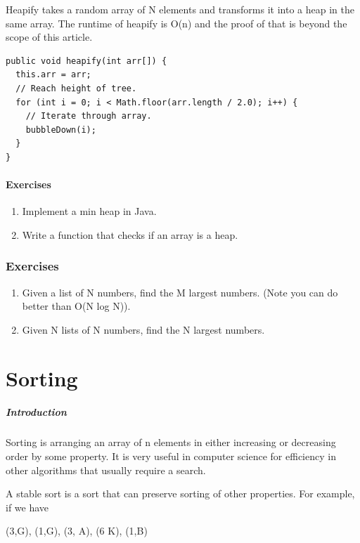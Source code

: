 \documentclass[11pt,oneside]{book}
\begin{document}
Heapify takes a random array of N elements and transforms it into a heap in the same array. The runtime of heapify is O(n) and the proof of that is beyond the scope of this article.

\begin{lstlisting}
public void heapify(int arr[]) {
  this.arr = arr;
  // Reach height of tree.
  for (int i = 0; i < Math.floor(arr.length / 2.0); i++) {
    // Iterate through array.
    bubbleDown(i);
  }
}
\end{lstlisting}

\subsection{Exercises}

\begin{enumerate}
\item Implement a min heap in Java.
\item Write a function that checks if an array is a heap. 
\end{enumerate}

        \section{ Exercises }
        

\begin{enumerate}
\item Given a list of N numbers, find the M largest numbers. (Note you can do better than O(N log N)).
\item Given N lists of N numbers, find the N largest numbers.
\end{enumerate}

\part{ Sorting }
    \subsubsection{ Introduction }
    

Sorting is arranging an array of n elements in either increasing or decreasing order by some property. It is very useful in computer science for efficiency in other algorithms that usually require a search.

A stable sort is a sort that can preserve sorting of other properties. For example, if we have

(3,G), (1,G), (3, A), (6 K), (1,B)
\end{document}
